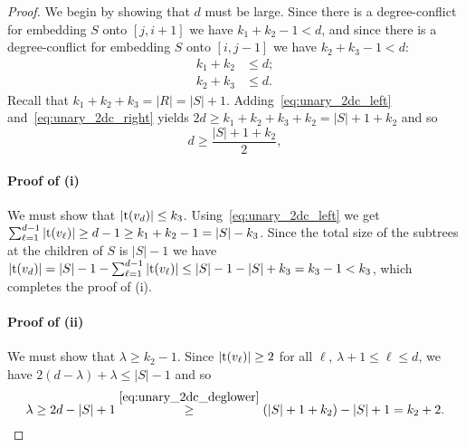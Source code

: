\documentclass[11pt,a4paper,colorlinks=true,urlcolor=blue,citecolor=red]{article}
\theoremstyle{plain}
\newcommand{\subsubparagraph}[1]{\paragraph{#1}}
\begin{document}
\begin{proof}
  We begin by showing that $d$ must be large. Since there is a
  degree-conflict for embedding $S$ onto $[j,i+1]$ we have
  $k_1+k_2-1<d$, and since there is a degree-conflict for embedding $S$
  onto $[i,j-1]$ we have $k_2+k_3-1<d$:
\begin{align}
    k_1+k_2&\leq d;\label{eq:unary_2dc_left}\\
    k_2+k_3&\leq d.\label{eq:unary_2dc_right}
  \end{align}
Recall that $k_1+k_2+k_3=|R|=|S|+1$. Adding~\eqref{eq:unary_2dc_left}
  and~\eqref{eq:unary_2dc_right} yields $2d\geq
  k_1+k_2+k_3+k_2=|S|+1+k_2$ and so
\begin{equation}
    \label{eq:unary_2dc_deglower}
    d\geq\frac{|S|+1+k_2}{2},
  \end{equation}
\subsubparagraph{Proof of (i)} We must show that $|\mathrm t(v_d)|\leq k_3$.
  Using~\eqref{eq:unary_2dc_left} we get
  $\sum_{\ell=1}^{d-1}|\mathrm t(v_\ell)|\geq d-1\geq k_1+k_2-1=|S|-k_3$. Since the
  total size of the subtrees at the children of $S$ is $|S|-1$ we have
  $|\mathrm t(v_d)|=|S|-1-\sum_{\ell=1}^{d-1}|\mathrm t(v_\ell)|\leq |S|-1-|S|+k_3=k_3-1<k_3$,
  which completes the proof of (i). 

  \subsubparagraph{Proof of (ii)} We must show that $\lambda\geq k_2-1$.
  Since $|\mathrm t(v_\ell)|\geq 2$ for all $\ell$, $\lambda+1\leq \ell\leq d$,
  we have $2(d-\lambda)+\lambda\leq |S|-1$ and so
\[\lambda\geq 2d-|S|+1\overset{\eqref{eq:unary_2dc_deglower}}{\geq}
  (|S|+1+k_2)-|S|+1=k_2+2.\]


\end{proof}
\end{document}
